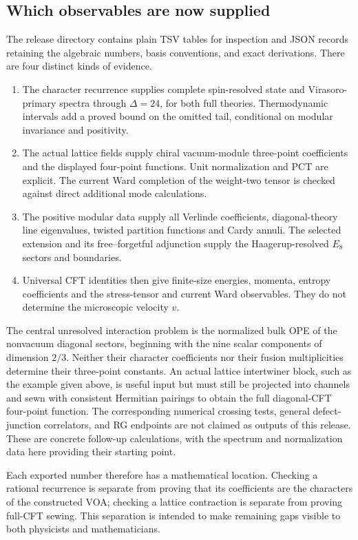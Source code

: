 \subsection{Which observables are now supplied}

The release directory  contains plain
TSV tables for inspection and JSON records retaining the algebraic
numbers, basis conventions, and exact derivations. There are four
distinct kinds of evidence.
\begin{enumerate}
 \item The character recurrence supplies complete spin-resolved state
 and Virasoro-primary spectra through $\Delta=24$, for both full
 theories. Thermodynamic intervals add a proved bound on the omitted
 tail, conditional on modular invariance and positivity.
 \item The actual lattice fields supply chiral vacuum-module
 three-point coefficients and the displayed four-point functions.
 Unit normalization and PCT are explicit. The current Ward completion
 of the weight-two tensor is checked against direct additional mode
 calculations.
 \item The positive modular data supply all Verlinde coefficients,
 diagonal-theory line eigenvalues, twisted partition functions and
 Cardy annuli. The selected extension and its free--forgetful
 adjunction supply the Haagerup-resolved $E_8$ sectors and boundaries.
 \item Universal CFT identities then give finite-size energies,
 momenta, entropy coefficients and the stress-tensor and current Ward
 observables. They do not determine the microscopic velocity $v$.
\end{enumerate}

The central unresolved interaction problem is the normalized bulk OPE
of the nonvacuum diagonal sectors, beginning with the nine scalar
components of dimension $2/3$. Neither their character coefficients
nor their fusion multiplicities determine their three-point constants.
An actual lattice intertwiner block, such as the example given above,
is useful input but must still be projected into channels and sewn
with consistent Hermitian pairings to obtain the full diagonal-CFT
four-point function. The corresponding numerical crossing tests,
general defect-junction correlators, and RG endpoints are not claimed
as outputs of this release. These are concrete follow-up calculations,
with the spectrum and normalization data here providing their starting
point.

Each exported number therefore has a mathematical location. Checking a
rational recurrence is separate from proving that its coefficients are
the characters of the constructed VOA; checking a lattice contraction
is separate from proving full-CFT sewing. This separation is intended
to make remaining gaps visible to both physicists and mathematicians.
